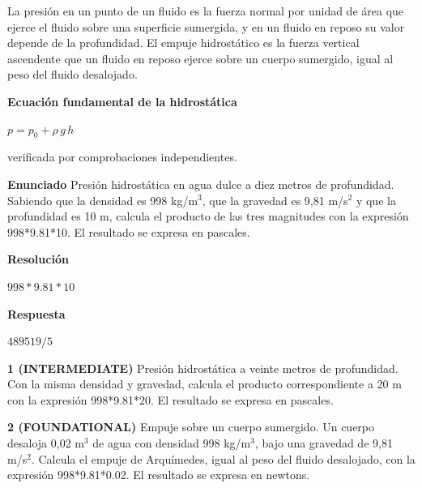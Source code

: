 \documentclass{book}
\begin{document}
\begin{tcolorbox}[title={Definición}, studiumdef, breakable]

La presión en un punto de un fluido es la fuerza normal por unidad de área que ejerce el fluido sobre una superficie sumergida, y en un fluido en reposo su valor depende de la profundidad. El empuje hidrostático es la fuerza vertical ascendente que un fluido en reposo ejerce sobre un cuerpo sumergido, igual al peso del fluido desalojado.
\end{tcolorbox}

\begin{tcolorbox}[title={Derivaciones}, studiumdef, breakable]

\noindent\textbf{Ecuación fundamental de la hidrostática}

\(p = p_0 + \rho\, g\, h\)

\noindent\footnotesize verificada por comprobaciones independientes.
\end{tcolorbox}

\begin{tcolorbox}[title={Problema resuelto}, studiumworked, breakable]

\noindent\textbf{Enunciado}
Presión hidrostática en agua dulce a diez metros de profundidad. Sabiendo que la densidad es 998 kg/m\(^{3}\), que la gravedad es 9,81 m/s\(^{2}\) y que la profundidad es 10 m, calcula el producto de las tres magnitudes con la expresión 998*9.81*10. El resultado se expresa en pascales.

\noindent\textbf{Resolución}

\(998*9.81*10\)

\noindent\textbf{Respuesta}

\(489519/5\)
\end{tcolorbox}

\begin{tcolorbox}[title={Ejercicios}, studiumworked, breakable]

\noindent\textbf{1 (INTERMEDIATE)}
Presión hidrostática a veinte metros de profundidad. Con la misma densidad y gravedad, calcula el producto correspondiente a 20 m con la expresión 998*9.81*20. El resultado se expresa en pascales.

\noindent\textbf{2 (FOUNDATIONAL)}
Empuje sobre un cuerpo sumergido. Un cuerpo desaloja 0,02 m\(^{3}\) de agua con densidad 998 kg/m\(^{3}\), bajo una gravedad de 9,81 m/s\(^{2}\). Calcula el empuje de Arquímedes, igual al peso del fluido desalojado, con la expresión 998*9.81*0.02. El resultado se expresa en newtons.
\end{tcolorbox}
\end{document}
